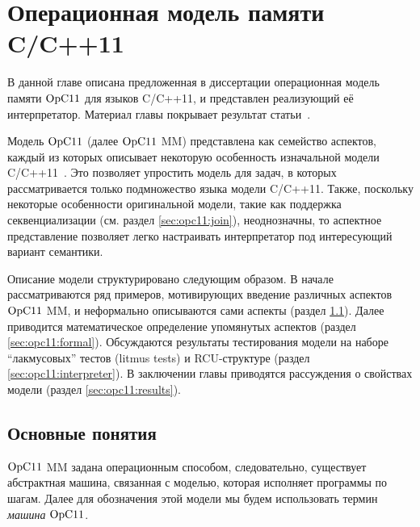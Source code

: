 \chapter{Операционная модель памяти C/C++11} \label{sec:opc11}
В данной главе описана предложенная в диссертации операционная модель
памяти $\mathrm{OpC11}$ для языков C/C++11, и представлен реализующий её интерпретатор.
Материал главы покрывает результат статьи~\cite{Podkopaev-al:CoRR16}.

Модель $\mathrm{OpC11}$ (далее $\mathrm{OpC11}$ MM) представлена как семейство аспектов, каждый из которых описывает некоторую особенность
изначальной модели C/C++11~\cite{Batty-al:POPL11}.
Это позволяет упростить модель для задач, в которых рассматривается только подмножество
языка модели C/C++11.
Также, поскольку некоторые особенности оригинальной модели,
такие как поддержка секвенциализации (см. раздел \ref{sec:opc11:join}), неоднозначны,
то аспектное представление позволяет легко настраивать интерпретатор под интересующий
вариант семантики.


Описание модели структурировано следующим образом.
В начале рассматриваются ряд примеров, мотивирующих введение
различных аспектов $\mathrm{OpC11}$ MM,
и неформально описываются сами аспекты (раздел \ref{sec:opc11:base}).
Далее приводится математическое определение упомянутых аспектов
(раздел \ref{sec:opc11:formal}).
Обсуждаются результаты тестирования модели на наборе ``лакмусовых'' тестов (litmus tests) и
RCU-структуре (раздел \ref{sec:opc11:interpreter}).
В заключении главы приводятся рассуждения о свойствах модели (раздел \ref{sec:opc11:results}).

\section{Основные понятия}
\label{sec:opc11:base}
\label{sec:opc11:fullmodel}
$\mathrm{OpC11}$ MM задана операционным способом, следовательно, существует
абстрактная машина, связанная с моделью, которая исполняет программы
по шагам.
Далее для обозначения этой модели мы будем использовать термин \emph{машина} $\mathrm{OpC11}$.

